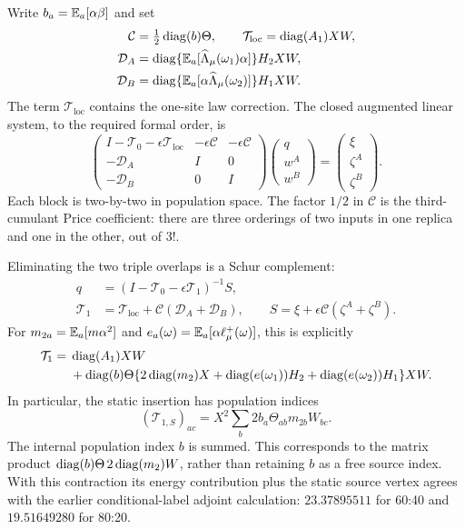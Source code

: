 Write $b_a=\mathbb E_a[\alpha\beta]$ and set
\begin{align*}
 \mathcal C&=\tfrac12\operatorname{diag}(b)\Theta,\qquad
 \mathcal T_{\mathrm{loc}}=\operatorname{diag}(A_1)XW,\\
 \mathcal D_A&=\operatorname{diag}\{\mathbb E_a[\widehat\Lambda_\mu(\omega_1)\alpha]\}
                    H_2XW,\\
 \mathcal D_B&=\operatorname{diag}\{\mathbb E_a[\alpha\widehat\Lambda_\mu(\omega_2)]\}
                    H_1XW.
\end{align*}
The term $\mathcal T_{\mathrm{loc}}$ contains the one-site law correction.
The closed augmented linear system, to the required formal order, is
\begin{equation}\label{eq:adopted-augmented}
 \begin{pmatrix}
 I-\mathcal T_0-\epsilon\mathcal T_{\mathrm{loc}}&-\epsilon\mathcal C&-\epsilon\mathcal C\\
 -\mathcal D_A&I&0\\-\mathcal D_B&0&I
 \end{pmatrix}
 \begin{pmatrix}q\\w^A\\w^B\end{pmatrix}
 =\begin{pmatrix}\xi\\\zeta^A\\\zeta^B\end{pmatrix}.
\end{equation}
Each block is two-by-two in population space. The factor $1/2$ in
$\mathcal C$ is the third-cumulant Price coefficient: there are three
orderings of two inputs in one replica and one in the other, out of $3!$.

Eliminating the two triple overlaps is a Schur complement:
\begin{align*}
 q&=(I-\mathcal T_0-\epsilon\mathcal T_1)^{-1}S,\\
 \mathcal T_1&=\mathcal T_{\mathrm{loc}}+\mathcal C(\mathcal D_A+\mathcal D_B),
 \qquad S=\xi+\epsilon\mathcal C(\zeta^A+\zeta^B).
\end{align*}
For $m_{2a}=\mathbb E_a[m\alpha^2]$ and
$e_a(\omega)=\mathbb E_a[\alpha\ell_\mu^+(\omega)]$, this is explicitly
\begin{align*}
 \mathcal T_1={}&\operatorname{diag}(A_1)XW\\
 &+\operatorname{diag}(b)\Theta\{
       2\operatorname{diag}(m_2)X+\operatorname{diag}(e(\omega_1))H_2
                        +\operatorname{diag}(e(\omega_2))H_1\}XW.
\end{align*}
In particular, the static insertion has population indices
\[
 (\mathcal T_{1,S})_{ac}
 =X^2\sum_b 2b_a\Theta_{ab}m_{2b}W_{bc}.
\]
The internal population index $b$ is summed. This corresponds to the matrix
product $\operatorname{diag}(b)\Theta\,2\operatorname{diag}(m_2)W$, rather than retaining $b$ as a
free source index. With this contraction its energy contribution plus the
static source vertex agrees with the earlier conditional-label adjoint
calculation: $23.37895511$ for 60:40 and $19.51649280$ for 80:20.

